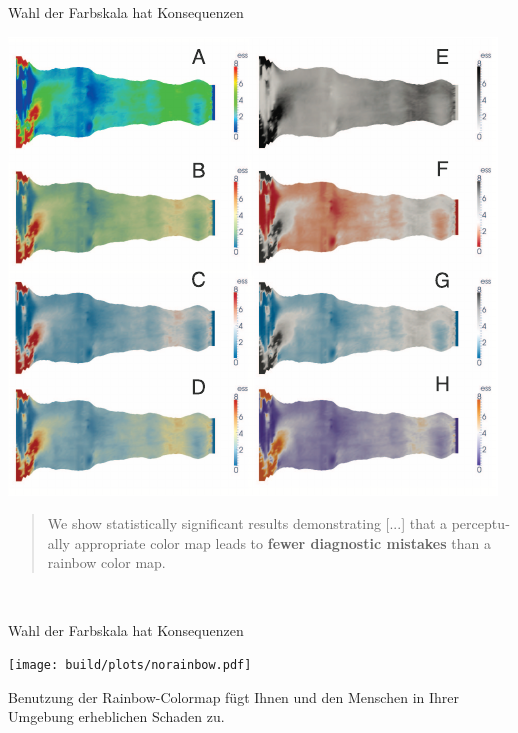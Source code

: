 \documentclass[aspectratio=1610, 9pt]{beamer}
\begin{document}
\begin{frame}[t]{Wahl der Farbskala hat Konsequenzen}
  \begin{center}
    \includegraphics[height=0.7\textheight]{images/heartdisease.pdf}
  \end{center}

  \leavevmode
  \foreignblockquote{english}{%
    We show statistically significant results demonstrating [...]
    that a perceptually appropriate color map
    leads to \textbf{fewer diagnostic mistakes} than a rainbow color map.%
  }\\[0.5\baselineskip]
  \small\cite{heartdisease}
\end{frame}

\begin{frame}[t]{Wahl der Farbskala hat Konsequenzen}  
  \centering

  \texttt{[image: build/plots/norainbow.pdf]}

  \begin{tcolorbox}[colframe=black, colback=white, fontupper=\raggedright\bfseries\zigarette, width=0.68\textwidth, boxrule=4pt, sharp corners]
    Benutzung der Rainbow-Colormap fügt Ihnen
    und den Menschen in Ihrer Umgebung erheblichen Schaden zu.
  \end{tcolorbox}
\end{frame}
\end{document}
